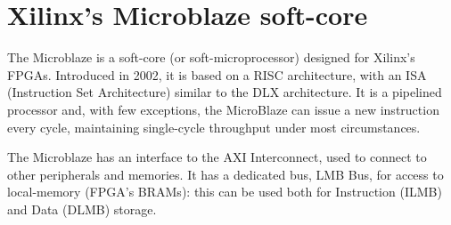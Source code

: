 
\section{Xilinx's Microblaze soft-core}

The Microblaze is a soft-core (or soft-microprocessor) designed for Xilinx's FPGAs. Introduced in 2002, it is based on a RISC architecture, with an ISA (Instruction Set Architecture) similar to the DLX architecture. It is a pipelined processor and, with few exceptions, the MicroBlaze can issue a new instruction every cycle, maintaining single-cycle throughput under most circumstances.\bigskip

The Microblaze has an interface to the AXI Interconnect, used to connect to other peripherals and memories. It has a dedicated bus, LMB Bus, for access to local-memory (FPGA's BRAMs): this can be used both for Instruction (ILMB) and Data (DLMB) storage.

